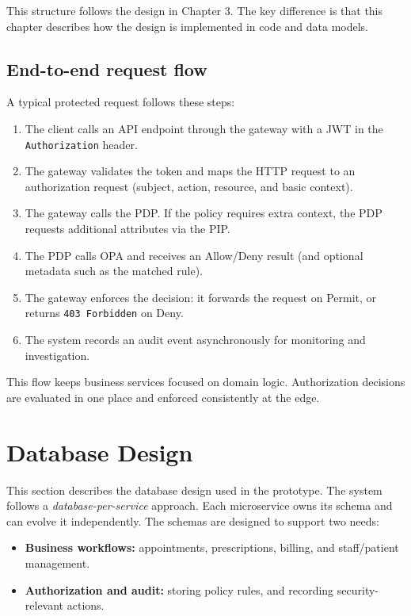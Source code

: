 This structure follows the design in Chapter 3. The key difference is that this chapter describes how the design is implemented in code and data models.

\subsection{End-to-end request flow}

A typical protected request follows these steps:

\begin{enumerate}
    \item The client calls an API endpoint through the gateway with a JWT in the \texttt{Authorization}
    header.

    \item The gateway validates the token and maps the HTTP request to an authorization request
    (subject, action, resource, and basic context).

    \item The gateway calls the PDP. If the policy requires extra context, the PDP requests additional
    attributes via the PIP.

    \item The PDP calls OPA and receives an Allow/Deny result (and optional metadata such as the matched rule).

    \item The gateway enforces the decision: it forwards the request on Permit, or returns
    \texttt{403 Forbidden} on Deny.

    \item The system records an audit event asynchronously for monitoring and investigation.
\end{enumerate}

This flow keeps business services focused on domain logic. Authorization decisions are evaluated in one place and enforced consistently at the edge.
\section{Database Design}
This section describes the database design used in the prototype. The system follows a \emph{database-per-service} approach. Each microservice owns its schema and can evolve it independently. The schemas are designed to support two needs:

\begin{itemize}
  \item \textbf{Business workflows:} appointments, prescriptions, billing, and staff/patient management.
  \item \textbf{Authorization and audit:} storing policy rules, and recording security-relevant actions.
\end{itemize}

